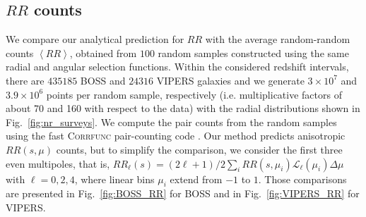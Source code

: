 \documentclass{aa}
\newcommand{\ev}[1]{\left\langle #1 \right\rangle}
\begin{document}
\subsection{$RR$ counts}
\label{sec:results_RR}
We compare our analytical prediction for $RR$ with the average random-random counts $\ev{RR}$, obtained from $100$ random samples constructed using the same radial and angular selection functions. Within the considered redshift intervals, there are $435185$ BOSS and $24316$ VIPERS galaxies and we generate $3\times10^{7}$ and $3.9\times10^{6}$ points per random sample, respectively (i.e. multiplicative factors of about 70 and 160 with respect to the data) with the radial distributions shown in Fig.~\ref{fig:nr_surveys}. We compute the pair counts from the random samples using the fast \textsc{Corrfunc} pair-counting code \citep{sinha2020corrfunc}. Our method predicts anisotropic $RR(s,\mu)$ counts, but to simplify the comparison, we consider the first three even multipoles, that is, $RR_\ell(s) = (2\ell + 1)/2 \sum_{i} RR(s,\mu_i) \mathcal{L}_\ell(\mu_i)\Delta \mu$ with $\ell = 0,2,4$,  where linear bins $\mu_i$ extend from $-1$ to $1$. Those comparisons are presented in Fig.~\ref{fig:BOSS_RR} for BOSS and in Fig.~\ref{fig:VIPERS_RR} for VIPERS.
%
\end{document}
